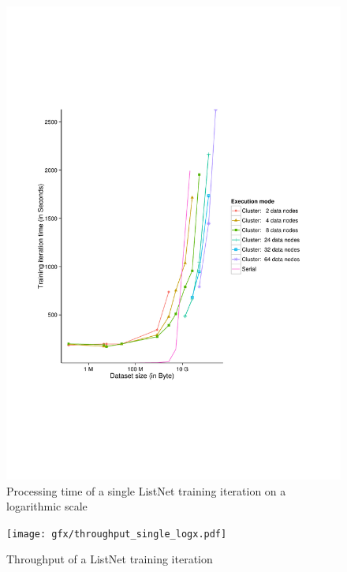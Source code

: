 \begin{figure}
\centering
\includegraphics[trim=0cm 5cm 0cm 5cm, scale=0.7]{gfx/time_single_logx.pdf}
\caption{Processing time of a single ListNet training iteration on a logarithmic scale}
\label{fig:listnet_train_time_log}
\end{figure}

\begin{figure}
\centering
\texttt{[image: gfx/throughput\_single\_logx.pdf]}
\caption{Throughput of a ListNet training iteration}
\label{fig:listnet_throughput}
\end{figure}